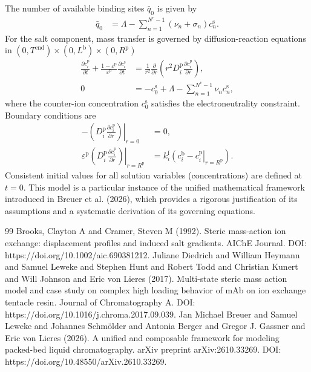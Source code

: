 \documentclass{article}
\begin{document}
The number of available binding sites $\bar{q}_{0}$ is given by
\begin{align}
    \bar{q}_{0}
    &= \Lambda
        - \sum_{n=1}^{N^{\mathrm{c}} - 1} \left( \nu_{n} + \sigma_{n} \right) c^{\mathrm{s}}_{n}.
\end{align}
For the salt component, mass transfer is governed by diffusion-reaction equations in $(0, T^{\mathrm{end}}) \times (0, L^{\mathrm{b}})\times (0, R^{\mathrm{p}})$
\begin{align}
    \frac{\partial c^{\mathrm{p}}_{i}}{\partial t}
        + \frac{1 - \varepsilon^{\mathrm{p}}}{\varepsilon^{\mathrm{p}}} \frac{\partial c^{\mathrm{s}}_{i}}{\partial t}
    &= \frac{1}{r^{2}} \frac{\partial }{\partial r} \left( r^{2} D^{\mathrm{p}}_{i} \frac{\partial c^{\mathrm{p}}_{i}}{\partial r} \right),
    \\
    0
    &= - c^{\mathrm{s}}_{0}
        + \Lambda
        - \sum_{n=1}^{N^{\mathrm{c}} - 1} \nu_{n} c^{\mathrm{s}}_{n},
\end{align}
where the counter-ion concentration $c^{\mathrm{s}}_{0}$ satisfies the electroneutrality constraint.
Boundary conditions are
\begin{align}
    - \left. \left( D^{\mathrm{p}}_{i} \frac{\partial c^{\mathrm{p}}_{i}}{\partial r} \right) \right|_{r=0}
    &= 0,
    \\
    \varepsilon^{\mathrm{p}} \left. \left( D^{\mathrm{p}}_{i} \frac{\partial c^{\mathrm{p}}_{i}}{\partial r} \right)\right|_{r = R^{\mathrm{p}}}
    &= k^{\mathrm{f}}_{i} \left. \left( c^{\mathrm{b}}_{i} - c^{\mathrm{p}}_{i} \right|_{r = R^{\mathrm{p}}} \right).
\end{align}
Consistent initial values for all solution variables (concentrations) are defined at $t = 0$.
This model is a particular instance of the unified mathematical framework introduced in Breuer et al. (2026), which provides a rigorous justification of its assumptions and a systematic derivation of its governing equations.
\begin{thebibliography}{99}
     Brooks, Clayton A and Cramer, Steven M (1992). Steric mass-action ion exchange: displacement profiles and induced salt gradients. AIChE Journal. DOI: https://doi.org/10.1002/aic.690381212.
     Juliane Diedrich and William Heymann and Samuel Leweke and Stephen Hunt and Robert Todd and Christian Kunert and Will Johnson and Eric von Lieres (2017). Multi-state steric mass action model and case study on complex high loading behavior of mAb on ion exchange tentacle resin. Journal of Chromatography A. DOI: https://doi.org/10.1016/j.chroma.2017.09.039.
     Jan Michael Breuer and Samuel Leweke and Johannes Schmölder and Antonia Berger and Gregor J. Gassner and Eric von Lieres (2026). A unified and composable framework for modeling packed-bed liquid chromatography. arXiv preprint arXiv:2610.33269. DOI: https://doi.org/10.48550/arXiv.2610.33269.
\end{thebibliography}
\end{document}
